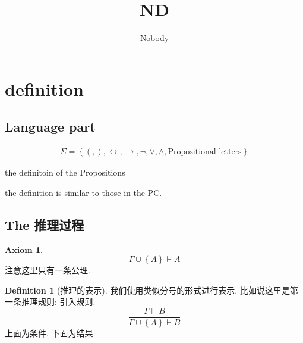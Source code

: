 \documentclass[12pt, a4paper]{ctexart} %
\title{ND}
\author{Nobody}
\theoremstyle{plain}
\theoremstyle{definition}
\newtheorem{definition}{Definition}[section]
\newtheorem*{axiom}{Axiom}
\begin{document}
\maketitle
\tableofcontents
\section{definition}
\subsection{Language part}
\begin{align*}
    \Sigma = \left\{ (, ), \leftrightarrow , \rightarrow , \neg , \vee, \wedge , \text{Propositional letters}\right\}
\end{align*}

the definitoin of the Propositions 

the definition is similar to those in the PC. 

\subsection{The 推理过程}
\begin{axiom}
    \begin{equation}
    \Gamma \cup  \left\{A \right\} \vdash A
    \end{equation}
    注意这里只有一条公理. 
\end{axiom}

\begin{definition}[推理的表示]
我们使用类似分号的形式进行表示. 比如说这里是第一条推理规则: 引入规则. 
\begin{equation}
    \frac{\Gamma \vdash  B}{\Gamma \cup \left\{A\right\} \vdash B}
\end{equation}
上面为条件, 下面为结果.
\end{definition}
\end{document}
